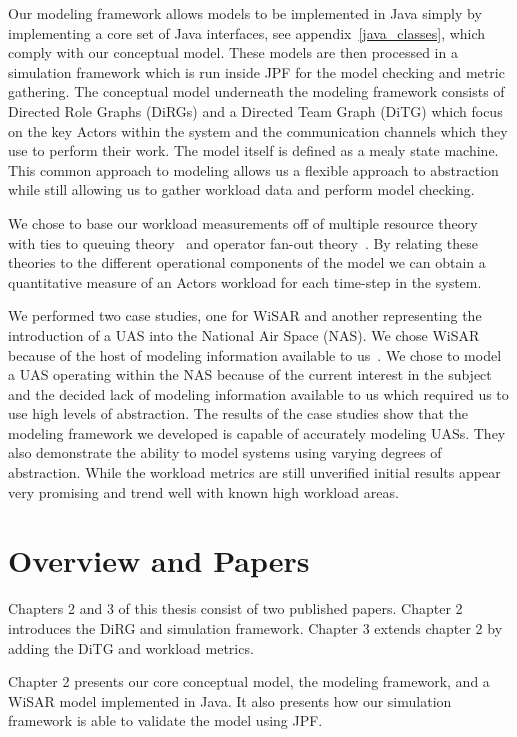 Our modeling framework allows models to be implemented in Java simply by implementing a core set of Java interfaces, see appendix~\ref{java_classes}, which comply with our conceptual model.  These models are then processed in a simulation framework which is run inside JPF for the model checking and metric gathering.  The conceptual model underneath the modeling framework consists of Directed Role Graphs (DiRGs) and a Directed Team Graph (DiTG) which focus on the key Actors within the system and the communication channels which they use to perform their work.  The model itself is defined as a mealy state machine.  This common approach to modeling allows us a flexible approach to abstraction while still allowing us to gather workload data and perform model checking.

We chose to base our workload measurements off of multiple resource theory~\cite{wickens2002multiple} with ties to queuing theory~\cite{newell1994unified} and operator fan-out theory~\cite{goodrich2010fanout}.  By relating these theories to the different operational components of the model we can obtain a quantitative measure of an Actors workload for each time-step in the system.

We performed two case studies, one for WiSAR and another representing the introduction of a UAS into the National Air Space (NAS).  We chose WiSAR because of the host of modeling information available to us~\cite{adams2009cognitive}.  We chose to model a UAS operating within the NAS because of the current interest in the subject~\cite{nasroadmap} and the decided lack of modeling information available to us which required us to use high levels of abstraction.  The results of the case studies show that the modeling framework we developed is capable of accurately modeling UASs.  They also demonstrate the ability to model systems using varying degrees of abstraction.  While the workload metrics are still unverified initial results appear very promising and trend well with known high workload areas.


\section{Overview and Papers}

Chapters 2 and 3 of this thesis consist of two published papers.  Chapter 2 introduces the DiRG and simulation framework.  Chapter 3 extends chapter 2 by adding the DiTG and workload metrics.

Chapter 2 presents our core conceptual model, the modeling framework, and a WiSAR model implemented in Java.  It also presents how our simulation framework is able to validate the model using JPF.

